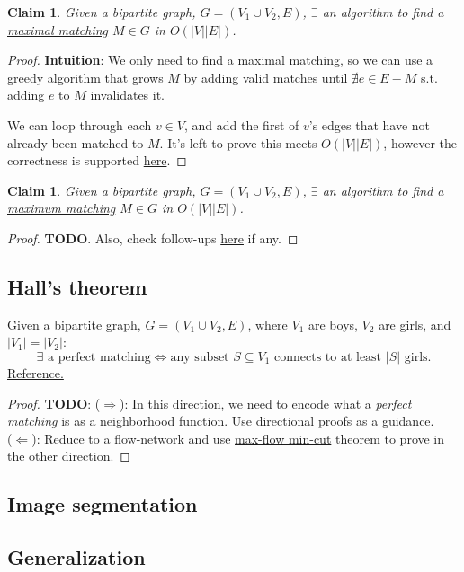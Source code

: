 \documentclass{article}
\newtheorem{claim}[theorem]{Claim}
\theoremstyle{definition}
\begin{document}
\begin{claim}
	Given a bipartite graph, $G = (V_1 \cup V_2, E)$, $\exists$ an algorithm to find a \hyperref[def:maximal_m]{maximal matching} $M \in G$ in $O(|V||E|)$.
\end{claim}

\begin{proof}
	\textbf{Intuition}: We only need to find a maximal matching, so we can use a greedy algorithm that grows $M$ by adding valid matches until $\nexists e \in E-M$ s.t. adding $e$ to $M$ \hyperref[def:match_edge]{invalidates} it.
	
	We can loop through each $v \in V$, and add the first of $v$'s edges that have not already been matched to $M$. It's left to prove this meets $O(|V||E|)$, however the correctness is supported \href{https://www.cs.dartmouth.edu/~ac/Teach/CS105-Winter05/Notes/kavathekar-scribe.pdf}{here}.
\end{proof}

\begin{claim}
	Given a bipartite graph, $G = (V_1 \cup V_2, E)$, $\exists$ an algorithm to find a \hyperref[def:maximum_m]{maximum matching} $M \in G$ in $O(|V||E|)$.
\end{claim}

\begin{proof}
	\textbf{TODO}. Also, check follow-ups \href{https://piazza.com/class/k52uzg6xjkl5xz?cid=705}{here} if any.
\end{proof}

\subsection{Hall's theorem}
Given a bipartite graph, $G = (V_1 \cup V_2, E)$, where $V_1$ are boys, $V_2$ are girls, and $|V_1|=|V_2|$:
$$\exists \text{ a perfect matching} \iff \text{any subset } S \subseteq V_1 \text{ connects to at least } |S| \text{ girls.}$$
\href{https://www2.cs.duke.edu/courses/spring19/compsci230/Notes/lecture14.pdf}{Reference.}

\begin{proof} 
\textbf{TODO}:
($\Rightarrow$): In this direction, we need to encode what a \textit{perfect matching} is as a neighborhood function. Use \href{http://www-cs-students.stanford.edu/~csilvers/proof/node4.html}{directional proofs} as a guidance.
\\($\Leftarrow$): Reduce to a flow-network and use \hyperref[thm:maxflowmincut]{max-flow min-cut} theorem to prove in the other direction.
\end{proof}

\subsection{Image segmentation}

\subsection{Generalization}
\end{document}
